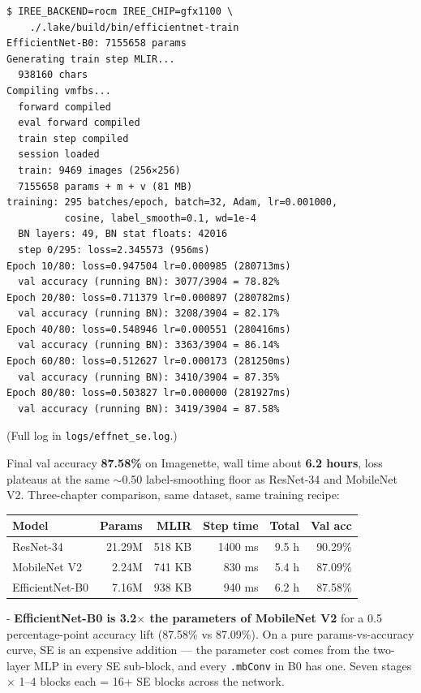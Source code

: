 \begin{verbatim}
$ IREE_BACKEND=rocm IREE_CHIP=gfx1100 \
    ./.lake/build/bin/efficientnet-train
EfficientNet-B0: 7155658 params
Generating train step MLIR...
  938160 chars
Compiling vmfbs...
  forward compiled
  eval forward compiled
  train step compiled
  session loaded
  train: 9469 images (256×256)
  7155658 params + m + v (81 MB)
training: 295 batches/epoch, batch=32, Adam, lr=0.001000,
          cosine, label_smooth=0.1, wd=1e-4
  BN layers: 49, BN stat floats: 42016
  step 0/295: loss=2.345573 (956ms)
Epoch 10/80: loss=0.947504 lr=0.000985 (280713ms)
  val accuracy (running BN): 3077/3904 = 78.82%
Epoch 20/80: loss=0.711379 lr=0.000897 (280782ms)
  val accuracy (running BN): 3208/3904 = 82.17%
Epoch 40/80: loss=0.548946 lr=0.000551 (280416ms)
  val accuracy (running BN): 3363/3904 = 86.14%
Epoch 60/80: loss=0.512627 lr=0.000173 (281250ms)
  val accuracy (running BN): 3410/3904 = 87.35%
Epoch 80/80: loss=0.503827 lr=0.000000 (281927ms)
  val accuracy (running BN): 3419/3904 = 87.58%
\end{verbatim}

(Full log in \texttt{logs/effnet\_se.log}.)

Final val accuracy \textbf{87.58\%} on Imagenette, wall time about
\textbf{6.2 hours}, loss plateaus at the same $\sim$0.50
label-smoothing floor as ResNet-34 and MobileNet V2. Three-chapter
comparison, same dataset, same training recipe:

\begin{center}
\begin{tabular}{l r r r r r}
\hline
Model            & Params  & MLIR     & Step time & Total   & Val acc \\
\hline
ResNet-34        & 21.29M  & 518 KB   & 1400 ms   & 9.5 h   & 90.29\% \\
MobileNet V2     &  2.24M  & 741 KB   &  830 ms   & 5.4 h   & 87.09\% \\
EfficientNet-B0  &  7.16M  & 938 KB   &  940 ms   & 6.2 h   & 87.58\% \\
\hline
\end{tabular}
\end{center}

- \textbf{EfficientNet-B0 is 3.2$\times$ the parameters of MobileNet V2}
  for a 0.5 percentage-point accuracy lift (87.58\% vs 87.09\%). On a
  pure params-vs-accuracy curve, SE is an expensive addition --- the
  parameter cost comes from the two-layer MLP in every SE sub-block,
  and every \texttt{.mbConv} in B0 has one. Seven stages $\times$
  1--4 blocks each = 16+ SE blocks across the network.

